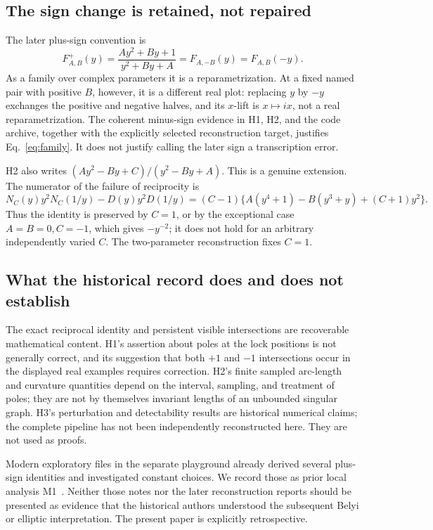 \subsection{The sign change is retained, not repaired}
The later plus-sign convention is
\[
F^+_{A,B}(y)=\frac{Ay^2+By+1}{y^2+By+A}=F_{A,-B}(y)=F_{A,B}(-y).
\]
As a family over complex parameters it is a reparametrization. At a fixed named pair with positive \(B\), however, it is a different real plot: replacing \(y\) by \(-y\) exchanges the positive and negative halves, and its \(x\)-lift is \(x\mapsto ix\), not a real reparametrization. The coherent minus-sign evidence in H1, H2, and the code archive, together with the explicitly selected reconstruction target, justifies Eq.~\eqref{eq:family}. It does not justify calling the later sign a transcription error.

H2 also writes \((Ay^2-By+C)/(y^2-By+A)\). This is a genuine extension. The numerator of the failure of reciprocity is
\[
N_C(y)y^2N_C(1/y)-D(y)y^2D(1/y)
=(C-1)\{A(y^4+1)-B(y^3+y)+(C+1)y^2\}.
\]
Thus the identity is preserved by \(C=1\), or by the exceptional case \(A=B=0,C=-1\), which gives \(-y^{-2}\); it does not hold for an arbitrary independently varied \(C\). The two-parameter reconstruction fixes \(C=1\).

\subsection{What the historical record does and does not establish}
The exact reciprocal identity and persistent visible intersections are recoverable mathematical content. H1's assertion about poles at the lock positions is not generally correct, and its suggestion that both \(+1\) and \(-1\) intersections occur in the displayed real examples requires correction. H2's finite sampled arc-length and curvature quantities depend on the interval, sampling, and treatment of poles; they are not by themselves invariant lengths of an unbounded singular graph. H3's perturbation and detectability results are historical numerical claims; the complete pipeline has not been independently reconstructed here. They are not used as proofs.

Modern exploratory files in the separate playground already derived several plus-sign identities and investigated constant choices. We record those as prior local analysis M1~\cite{M1}. Neither those notes nor the later reconstruction reports should be presented as evidence that the historical authors understood the subsequent Belyi or elliptic interpretation. The present paper is explicitly retrospective.

